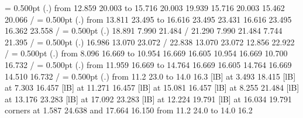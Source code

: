 %
%
%
\linethickness= 0.500pt
\setplotsymbol ({\thinlinefont .})
\putrule from 12.859 20.003 to 15.716 20.003
%
%
 19.939 15.716 20.003 15.462 20.066 /
%
%
%
\linethickness= 0.500pt
\setplotsymbol ({\thinlinefont .})
\putrule from 13.811 23.495 to 16.616 23.495
%
%
 23.431 16.616 23.495 16.362 23.558 /
%
%
%
\linethickness= 0.500pt
\setplotsymbol ({\thinlinefont .})
 18.891  7.990 21.484 /
%
%
 21.290  7.990 21.484  7.744 21.395 /
%
%
%
\linethickness= 0.500pt
\setplotsymbol ({\thinlinefont .})
 16.986 13.070 23.072 /
%
%
 22.838 13.070 23.072 12.856 22.922 /
%
%
%
\linethickness= 0.500pt
\setplotsymbol ({\thinlinefont .})
\putrule from  8.096 16.669 to 10.954 16.669
%
%
 16.605 10.954 16.669 10.700 16.732 /
%
%
%
\linethickness= 0.500pt
\setplotsymbol ({\thinlinefont .})
\putrule from 11.959 16.669 to 14.764 16.669
%
%
 16.605 14.764 16.669 14.510 16.732 /
%
\linethickness= 0.500pt
\setplotsymbol ({\thinlinefont .})
\putrule from 11.2 23.0 to 14.0 16.3
%
\sf
%
%
 [lB] at  3.493 18.415
%
%
 [lB] at  7.303 16.457
%
%
 [lB] at 11.271 16.457
%
%
 [lB] at 15.081 16.457
%
%
 [lB] at  8.255 21.484
%
%
 [lB] at 13.176 23.283
%
%
 [lB] at 17.092 23.283
%
%
 [lB] at 12.224 19.791
%
%
 [lB] at 16.034 19.791
\linethickness=0pt
\putrectangle corners at  1.587 24.638 and 17.664 16.150
%
\putrule from  11.2 24.0 to 14.0 16.2
%
\endpicture
